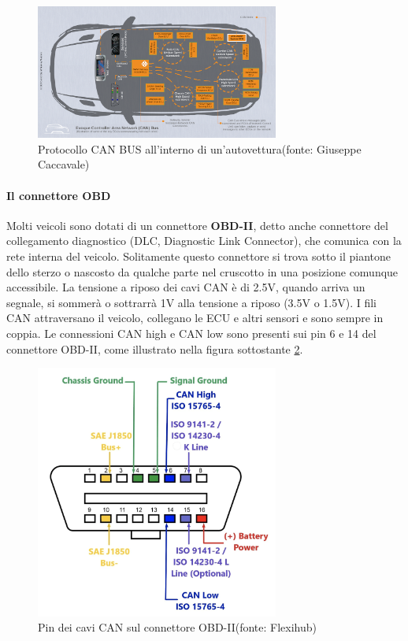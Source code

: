 \documentclass[12pt, a4paper, italian]{report}
\numberwithin{figure}{chapter}
\numberwithin{table}{chapter}
\begin{document}
\begin{figure}[h]
  \centering
  \includegraphics[width=8cm]{CAN_auto.png}
  \caption{Protocollo CAN BUS all'interno di un'autovettura\protect\footnotemark (fonte: Giuseppe Caccavale)}
  \label{fig:Protocallo CAN-BUS}
\end{figure}%

\paragraph{Il connettore OBD} Molti veicoli sono dotati di un connettore \textbf{OBD-II}, detto anche connettore del collegamento diagnostico (DLC, Diagnostic Link Connector), che comunica con la rete interna del veicolo. Solitamente questo connettore si trova sotto il piantone dello sterzo o nascosto da qualche parte nel cruscotto in una posizione comunque accessibile.
La tensione a riposo dei cavi CAN è di 2.5V, quando arriva un segnale, si sommerà o sottrarrà 1V alla tensione a riposo  (3.5V o 1.5V). I fili CAN attraversano il veicolo, collegano le ECU e altri sensori e sono sempre in coppia. Le connessioni CAN high e CAN low sono presenti sui pin 6 e 14 del connettore OBD-II, come illustrato nella figura sottostante \ref{fig:Connettore OBD}. \cite{manualeHacker}


\begin{figure}[h]
  \centering
  \includegraphics[width=8cm]{Connettore_OBD-II.png}
  \caption{Pin dei cavi CAN sul connettore OBD-II\protect\footnotemark (fonte: Flexihub)}
  \label{fig:Connettore OBD}
\end{figure}
\end{document}
